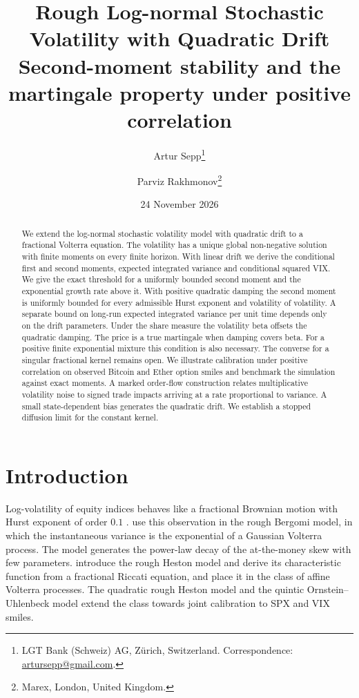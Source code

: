 \documentclass[11pt,a4paper]{article}
\theoremstyle{definition}
\begin{document}
\title{Rough Log-normal Stochastic Volatility with Quadratic Drift\\[2pt] {\large Second-moment stability and the martingale property under positive correlation}}
\author{Artur Sepp\thanks{LGT Bank (Schweiz) AG, Z\"urich, Switzerland. Correspondence: \href{mailto:artursepp@gmail.com}{artursepp@gmail.com}.} \and Parviz Rakhmonov\thanks{Marex, London, United Kingdom.}}
\date{24 November 2026}
\maketitle

\begin{abstract}
We extend the log-normal stochastic volatility model with quadratic drift to a fractional Volterra equation. The volatility has a unique global non-negative solution with finite moments on every finite horizon. With linear drift we derive the conditional first and second moments, expected integrated variance and conditional squared VIX. We give the exact threshold for a uniformly bounded second moment and the exponential growth rate above it. With positive quadratic damping the second moment is uniformly bounded for every admissible Hurst exponent and volatility of volatility. A separate bound on long-run expected integrated variance per unit time depends only on the drift parameters. Under the share measure the volatility beta offsets the quadratic damping. The price is a true martingale when damping covers beta. For a positive finite exponential mixture this condition is also necessary. The converse for a singular fractional kernel remains open. We illustrate calibration under positive correlation on observed Bitcoin and Ether option smiles and benchmark the simulation against exact moments. A marked order-flow construction relates multiplicative volatility noise to signed trade impacts arriving at a rate proportional to variance. A small state-dependent bias generates the quadratic drift. We establish a stopped diffusion limit for the constant kernel.
\end{abstract}

\section{Introduction}\label{sec:intro}

Log-volatility of equity indices behaves like a fractional Brownian motion with Hurst exponent of order $0.1$ \citep{GatheralJaissonRosenbaum2018}. \citet{BayerFrizGatheral2016} use this observation in the rough Bergomi model, in which the instantaneous variance is the exponential of a Gaussian Volterra process. The model generates the power-law decay of the at-the-money skew with few parameters. \citet{ElEuchRosenbaum2019} introduce the rough Heston model and derive its characteristic function from a fractional Riccati equation, and \citet{AbiJaberLarssonPulido2019} place it in the class of affine Volterra processes. The quadratic rough Heston model \citep{GatheralJusselinRosenbaum2020} and the quintic Ornstein--Uhlenbeck model \citep{AbiJaberIllandLi2022} extend the class towards joint calibration to SPX and VIX smiles.
\end{document}
